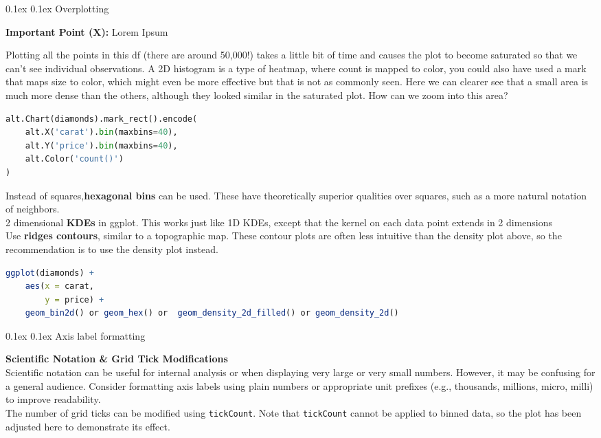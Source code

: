 \documentclass[8pt,landscape]{article}
\makeatletter
\renewcommand{\subsection}{\@startsection{subsection}{2}{0pt}%
    {0.1ex}%
    {0.1ex}%
    {\fontsize{8}{9}\bfseries\color{blue}}} %
\newcommand{\smalltext}[1]{%
  {\fontsize{8}{9}\selectfont\sloppy #1\par}%
}
\makeatother
\begin{document}
\fontsize{8}{9}\selectfont %
\pagestyle{empty}
\begin{multicols}{3}

\subsection{Overplotting}
\smalltext{
\textbf{Important Point ($\mathbf{X}$):} Lorem Ipsum \\
}
\smalltext{
Plotting all the points in this df (there are around 50,000!) takes a little bit of time and causes the plot to become saturated so that we can't see individual observations.
A 2D histogram is a type of heatmap, where count is mapped to color, you could also have used a mark that maps size to color, which might even be more effective but that is not as commonly seen.
Here we can clearer see that a small area is much more dense than the others, although they looked similar in the saturated plot. How can we zoom into this area?
}
\begin{lstlisting}[language=Python]
alt.Chart(diamonds).mark_rect().encode(
    alt.X('carat').bin(maxbins=40),
    alt.Y('price').bin(maxbins=40),
    alt.Color('count()')
)
\end{lstlisting}
\smalltext{
    Instead of squares,\textbf{hexagonal bins} can be used. These have theoretically superior qualities over squares, such as a more natural notation of neighbors. \\
    2 dimensional \textbf{KDEs} in ggplot. This works just like 1D KDEs, except that the kernel on each data point extends in 2 dimensions \\
    Use \textbf{ridges contours}, similar to a topographic map. These contour plots are often less intuitive than the density plot above, so the recommendation is to use the density plot instead.
}
\begin{lstlisting}[language=R]
ggplot(diamonds) +
    aes(x = carat,
        y = price) +
    geom_bin2d() or geom_hex() or  geom_density_2d_filled() or geom_density_2d()
\end{lstlisting}

\subsection{Axis label formatting}
\smalltext{
\textbf{Scientific Notation \& Grid Tick Modifications} \\
Scientific notation can be useful for internal analysis or when displaying very large or very small numbers. 
However, it may be confusing for a general audience. 
Consider formatting axis labels using plain numbers or appropriate unit prefixes (e.g., thousands, millions, micro, milli) to improve readability. \\[6pt]
The number of grid ticks can be modified using \texttt{tickCount}. 
Note that \texttt{tickCount} cannot be applied to binned data, so the plot has been adjusted here to demonstrate its effect.
}


\end{multicols}
\end{document}
